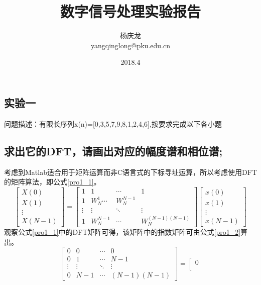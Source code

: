 \documentclass[UTF8]{article}
\begin{document}
\begin{CJK}{UTF8}{gkai}
\title{数字信号处理实验报告}
\author{杨庆龙\\yangqinglong@pku.edu.cn}
\date{2018.4}
\maketitle

\section{实验一}
问题描述：有限长序列x(n)=[0,3,5,7,9,8,1,2,4,6],按要求完成以下各小题
\subsection{求出它的DFT，请画出对应的幅度谱和相位谱;}
考虑到Matlab适合用于矩阵运算而非C语言式的下标寻址运算，所以考虑使用DFT的矩阵算法，即公式\ref{pro1_1}。
\begin{equation}
\left[\begin{array}{c}
X(0)\\
X(1)\\
\vdots\\
X(N-1)
\end{array}\right]
=
\left[\begin{array}{cccc}
1 & 1 & \cdots & 1\\
1 & W_N^1 \cdots & W_N^{N-1}\\
\vdots&\vdots&\ddots&\vdots\\
1 & W_N^{N-1} & \cdots & W_N^{(N-1)(N-1)}
\end{array}
\right]
\left[
\begin{array}{c}
  x(0)\\
  x(1)\\
  \vdots\\
  x(N-1)
\end{array}
\right]\label{pro1_1}
\end{equation}
观察公式\ref{pro1_1}中的DFT矩阵可得，该矩阵中的指数矩阵可由公式\ref{pro1_2}算出。
\begin{equation}
  \left[\begin{array}{cccc}
  0&0&\cdots&0\\
  0&1&\cdots&N-1\\
  \vdots&\vdots&\ddots&\vdots\\
  0&N-1&\cdots&(N-1)(N-1)
  \end{array}
  \right]
  =
  \left[\begin{array}{c}
  0\\

\end{array}
\end{equation}
\end{CJK}
\end{document}
